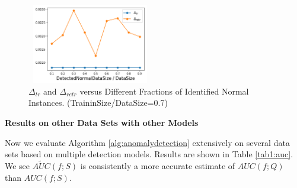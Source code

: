 \begin{figure}[h]
\centering
\includegraphics[width=5.5cm,height=3.5cm]{exp1_anomalyconfidence.png}
\vspace{-10pt} 
\caption{$\Delta_{tr}$ and $\Delta_{retr}$ versus Different 
Fractions of Identified Normal Instances. (TraininSize/DataSize=0.7)}
\label{exp1:anomalyconfidence}
\end{figure}

{\noindent \bf Results on other Data Sets with 
other Models} 

Now we evaluate Algorithm \ref{alg:anomalydetection} 
extensively on several data sets based on 
multiple detection models. 
Results are shown in Table \ref{tab1:auc}. 
We see $\widetilde{AUC}(f; S)$ is consistently 
a more accurate estimate of $AUC(f; Q)$ than 
$AUC(f; S)$. 

